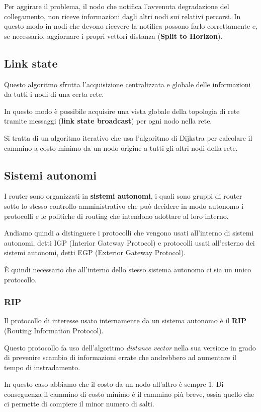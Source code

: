 Per aggirare il problema, il nodo che notifica l'avvenuta degradazione
del collegamento, non riceve informazioni dagli altri nodi sui relativi
percorsi. In questo modo in nodi che devono ricevere la notifica
possono farlo correttamente e, se necessario, aggiornare i propri
vettori distanza (\textbf{Split to Horizon}).

\subsection{Link state}
Questo algoritmo sfrutta l'acquisizione centralizzata e globale delle 
informazioni da tutti i nodi di una certa rete.

In questo modo è possibile acquisire una vista globale della topologia
di rete tramite messaggi (\textbf{link state broadcast}) per ogni nodo
nella rete.

Si tratta di un algoritmo iterativo che usa l'algoritmo di Dijkstra
per calcolare il cammino a costo minimo da un nodo origine a tutti gli
altri nodi della rete.

\subsection{Sistemi autonomi}
I router sono organizzati in \textbf{sistemi autonomi}, i quali sono
gruppi di router sotto lo stesso controllo amministrativo che può
decidere in modo autonomo i protocolli e le politiche di routing che
intendono adottare al loro interno.

Andiamo quindi a distinguere i protocolli che vengono usati all'interno
di sistemi autonomi, detti IGP (Interior Gateway Protocol) e protocolli
usati all'esterno dei sistemi autonomi, detti EGP (Exterior Gateway
Protocol).

\`E quindi necessario che all'interno dello stesso sistema autonomo
ci sia un unico protocollo.

\subsubsection{RIP}
Il protocollo di interesse usato internamente da un sistema autonomo
è il \textbf{RIP} (Routing Information Protocol).

Questo protocollo fa uso dell'algoritmo \emph{distance vector} nella 
sua versione in grado di prevenire scambio di informazioni errate che
andrebbero ad aumentare il tempo di instradamento.

In questo caso abbiamo che il costo da un nodo all'altro è sempre 1.
Di conseguenza il cammino di costo minimo è il cammino più breve, ossia
quello che ci permette di compiere il minor numero di salti.

